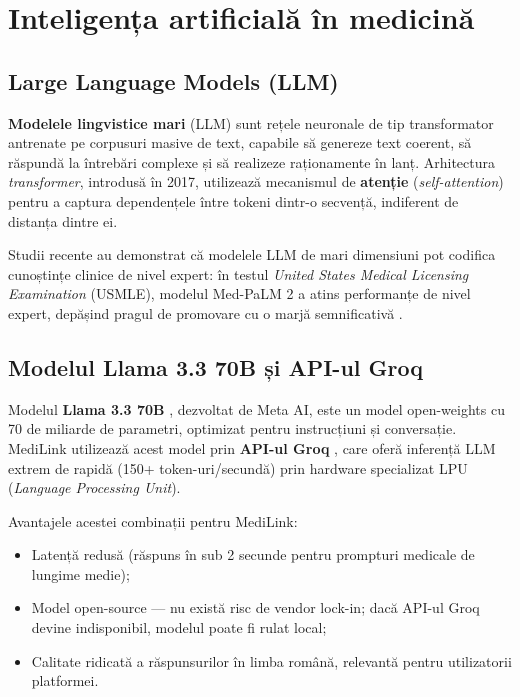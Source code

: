 \section{Inteligența artificială în medicină}

\subsection{Large Language Models (LLM)}

\textbf{Modelele lingvistice mari} (LLM) sunt rețele neuronale de tip transformator \cite{vaswani2017attention} antrenate pe corpusuri masive de text, capabile să genereze text coerent, să răspundă la întrebări complexe și să realizeze raționamente în lanț. Arhitectura \textit{transformer}, introdusă în 2017, utilizează mecanismul de \textbf{atenție} (\textit{self-attention}) pentru a captura dependențele între tokeni dintr-o secvență, indiferent de distanța dintre ei.

Studii recente au demonstrat că modelele LLM de mari dimensiuni pot codifica cunoștințe clinice de nivel expert: în testul \textit{United States Medical Licensing Examination} (USMLE), modelul Med-PaLM 2 a atins performanțe de nivel expert, depășind pragul de promovare cu o marjă semnificativă \cite{singhal2023large}.

\subsection{Modelul Llama 3.3 70B și API-ul Groq}

Modelul \textbf{Llama 3.3 70B} \cite{meta2024llama}, dezvoltat de Meta AI, este un model open-weights cu 70 de miliarde de parametri, optimizat pentru instrucțiuni și conversație. MediLink utilizează acest model prin \textbf{API-ul Groq} \cite{groq2024}, care oferă inferență LLM extrem de rapidă (150+ token-uri/secundă) prin hardware specializat LPU (\textit{Language Processing Unit}).

Avantajele acestei combinații pentru MediLink:
\begin{itemize}
  \item Latență redusă (răspuns în sub 2 secunde pentru prompturi medicale de lungime medie);
  \item Model open-source --- nu există risc de vendor lock-in; dacă API-ul Groq devine indisponibil, modelul poate fi rulat local;
  \item Calitate ridicată a răspunsurilor în limba română, relevantă pentru utilizatorii platformei.
\end{itemize}

